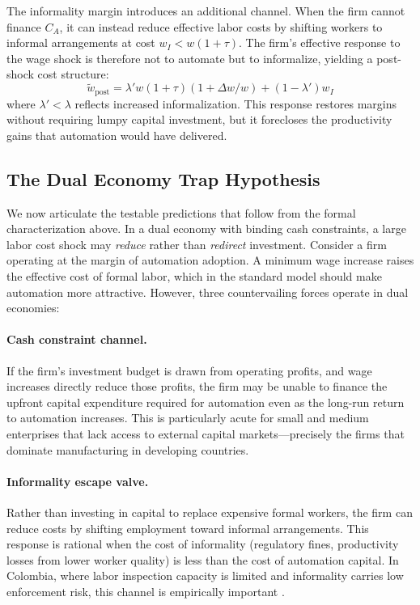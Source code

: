 \documentclass[5p,times,authoryear]{elsarticle}
\begin{document}
The informality margin introduces an additional channel. When the firm cannot finance $C_A$, it can instead reduce effective labor costs by shifting workers to informal arrangements at cost $w_I < w(1+\tau)$. The firm's effective response to the wage shock is therefore not to automate but to informalize, yielding a post-shock cost structure:
\begin{equation}
\label{eq:informalize}
\tilde{w}_{\text{post}} = \lambda' w(1+\tau)(1 + \Delta w/w) + (1-\lambda') w_I
\end{equation}
where $\lambda' < \lambda$ reflects increased informalization. This response restores margins without requiring lumpy capital investment, but it forecloses the productivity gains that automation would have delivered.

\subsection{The Dual Economy Trap Hypothesis}
\label{subsec:trap_hypothesis}

We now articulate the testable predictions that follow from the formal characterization above. In a dual economy with binding cash constraints, a large labor cost shock may \emph{reduce} rather than \emph{redirect} investment. Consider a firm operating at the margin of automation adoption. A minimum wage increase raises the effective cost of formal labor, which in the standard model should make automation more attractive. However, three countervailing forces operate in dual economies:

\paragraph{Cash constraint channel.} If the firm's investment budget is drawn from operating profits, and wage increases directly reduce those profits, the firm may be unable to finance the upfront capital expenditure required for automation even as the long-run return to automation increases. This is particularly acute for small and medium enterprises that lack access to external capital markets---precisely the firms that dominate manufacturing in developing countries.

\paragraph{Informality escape valve.} Rather than investing in capital to replace expensive formal workers, the firm can reduce costs by shifting employment toward informal arrangements. This response is rational when the cost of informality (regulatory fines, productivity losses from lower worker quality) is less than the cost of automation capital. In Colombia, where labor inspection capacity is limited and informality carries low enforcement risk, this channel is empirically important \citep{ulyssea2018}.
\end{document}

